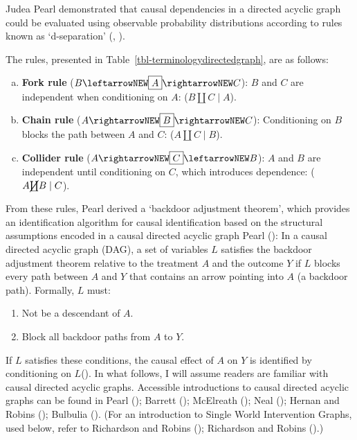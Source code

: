 \documentclass[
  single column]{article}
\providecommand{\tightlist}{%
  \setlength{\itemsep}{0pt}\setlength{\parskip}{0pt}}\usepackage{longtable,booktabs,array}
\begin{document}
Judea Pearl demonstrated that causal dependencies in a directed acyclic
graph could be evaluated using observable probability distributions
according to rules known as `d-separation'
(, ).

The rules, presented in Table~\ref{tbl-terminologydirectedgraph}, are as
follows:

\begin{enumerate}[a)]
     \item  {\bf Fork rule} ($B \leftarrowNEW \boxed{A} \rightarrowNEW C$): $B$ and $C$ are independent when conditioning on $A$: ($B \coprod C \mid A$).
     \item  {\bf Chain rule} ($A \rightarrowNEW \boxed{B} \rightarrowNEW C$): Conditioning on $B$ blocks the path between $A$ and $C$: ($A \coprod C \mid B$).
     \item  {\bf Collider rule} ($A \rightarrowNEW \boxed{C} \leftarrowNEW B$): $A$ and $B$ are independent until conditioning on $C$, which introduces dependence: ($A \cancel{\coprod} B \mid C$). 
 \end{enumerate}

From these rules, Pearl derived a `backdoor adjustment theorem', which
provides an identification algorithm for causal identification based on
the structural assumptions encoded in a causal directed acyclic graph
Pearl (): In a causal directed acyclic
graph (DAG), a set of variables \(L\) satisfies the backdoor adjustment
theorem relative to the treatment \(A\) and the outcome \(Y\) if \(L\)
blocks every path between \(A\) and \(Y\) that contains an arrow
pointing into \(A\) (a backdoor path). Formally, \(L\) must:

\begin{enumerate}
\def\labelenumi{\arabic{enumi}.}
\tightlist
\item
  Not be a descendant of \(A\).
\item
  Block all backdoor paths from \(A\) to \(Y\).
\end{enumerate}

If \(L\) satisfies these conditions, the causal effect of \(A\) on \(Y\)
is identified by conditioning on
\(\boxed{L}\)(). In what follows, I
will assume readers are familiar with causal directed acyclic graphs.
Accessible introductions to causal directed acyclic graphs can be found
in Pearl (); Barrett
(); McElreath
(); Neal
(); Hernan and Robins
(); Bulbulia
(). (For an introduction to Single
World Intervention Graphs, used below, refer to Richardson and Robins
(); Richardson and Robins
().)
\end{document}
